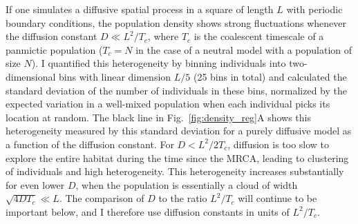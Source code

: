 \documentclass[aps,rmp, twocolumn]{revtex4}
\begin{document}
If one simulates a diffusive spatial process in a square of length $L$ with periodic boundary conditions, the population density shows strong fluctuations whenever the diffusion constant $D\ll L^2/T_c$, where $T_c$ is the coalescent timescale of a panmictic population ($T_c=N$ in the case of a neutral model with a population of size $N$).
I quantified this heterogeneity by binning individuals into two-dimensional bins with linear dimension $L/5$ (25 bins in total) and calculated the standard deviation of the number of individuals in these bins, normalized by the expected variation in a well-mixed population when each individual picks its location at random.
The black line in Fig.~\ref{fig:density_reg}A shows this heterogeneity measured by this standard deviation for a purely diffusive model as a function of the diffusion constant.
For $D < L^2/2T_c$, diffusion is too slow to explore the entire habitat during the time since the MRCA, leading to clustering of individuals and high heterogeneity.
This heterogeneity increases substantially for even lower $D$, when the population is essentially a cloud of width $\sqrt{4DT_c}\ll L$.
The comparison of $D$ to the ratio $L^2/T_c$ will continue to be important below, and I therefore use diffusion constants in units of $L^2/T_c$.
\end{document}
